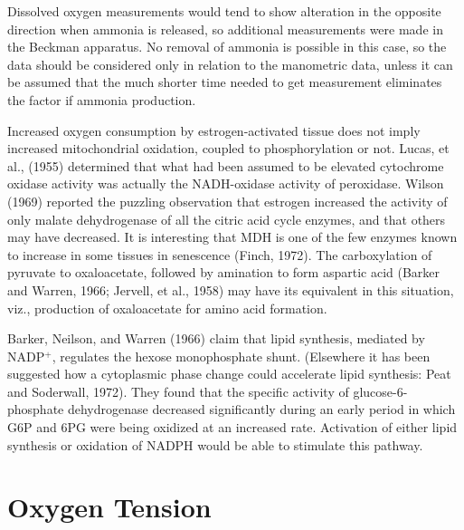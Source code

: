Dissolved oxygen measurements would tend to show alteration in the opposite direction when ammonia is released, so additional measurements were made in the Beckman apparatus. No removal of ammonia is possible in this case, so the data should be considered only in relation to the manometric data, unless it can be assumed that the much shorter time needed to get measurement eliminates the factor if ammonia production.

Increased oxygen consumption by estrogen-activated tissue does not imply increased mitochondrial oxidation, coupled to phosphorylation or not. Lucas, et al., (1955) determined that what had been assumed to be elevated cytochrome oxidase activity was actually the NADH-oxidase activity of peroxidase. Wilson (1969) reported the puzzling observation that estrogen increased the activity of only malate dehydrogenase of all the citric acid cycle enzymes, and that others may have decreased. It is interesting that MDH is one of the few enzymes known to increase in some tissues in senescence (Finch, 1972). The carboxylation of pyruvate to oxaloacetate, followed by amination to form aspartic acid (Barker and Warren, 1966; Jervell, et al., 1958) may have its equivalent in this situation, viz., production of oxaloacetate for amino acid formation.

Barker, Neilson, and Warren (1966) claim that lipid synthesis, mediated by NADP$^{+}$, regulates the hexose monophosphate shunt. (Elsewhere it has been suggested how a cytoplasmic phase change could accelerate lipid synthesis: Peat and Soderwall, 1972). They found that the specific activity of glucose-6-phosphate dehydrogenase decreased significantly during an early period in which G6P and 6PG were being oxidized at an increased rate. Activation of either lipid synthesis or oxidation of NADPH would be able to stimulate this pathway.

\section{Oxygen Tension}

